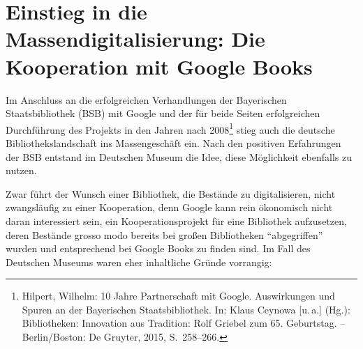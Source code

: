 \documentclass[a4paper,
fontsize=11pt,
oneside,
numbers=noperiodatend,
parskip=half-,
bibliography=totoc,
final
]{scrartcl}
\begin{document}
\hypertarget{einstieg-in-die-massendigitalisierung-die-kooperation-mit-google-books}{%
\section{Einstieg in die Massendigitalisierung: Die Kooperation
mit Google
Books}\label{einstieg-in-die-massendigitalisierung-die-kooperation-mit-google-books}}

Im Anschluss an die erfolgreichen Verhandlungen der Bayerischen
Staatsbibliothek (BSB) mit Google und der für beide Seiten erfolgreichen
Durchführung des Projekts in den Jahren nach 2008\footnote{Hilpert,
  Wilhelm: 10 Jahre Partnerschaft mit Google. Auswirkungen und Spuren an
  der Bayerischen Staatsbibliothek. In: Klaus Ceynowa {[}u.\,a.{]}
  (Hg.): Bibliotheken: Innovation aus Tradition: Rolf Griebel zum 65.
  Geburtstag. -- Berlin/Boston: De Gruyter, 2015, S.~258--266.} stieg
auch die deutsche Bibliothekslandschaft ins Massengeschäft ein. Nach den
positiven Erfahrungen der BSB entstand im Deutschen Museum die Idee,
diese Möglichkeit ebenfalls zu nutzen.

Zwar führt der Wunsch einer Bibliothek, die Bestände zu digitalisieren,
nicht zwangsläufig zu einer Kooperation, denn Google kann rein
ökonomisch nicht daran interessiert sein, ein Kooperationsprojekt für
eine Bibliothek aufzusetzen, deren Bestände grosso modo bereits bei
großen Bibliotheken \enquote{abgegriffen} wurden und entsprechend bei
Google Books zu finden sind. Im Fall des Deutschen Museums waren eher
inhaltliche Gründe vorrangig:
\end{document}
